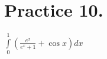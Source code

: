 \documentclass[a4paper,12pt]{article}
\begin{document}
%
%
%
\section*{Practice 10.}
$\int\limits_0^1(\frac{e^x}{e^x+1}+\cos x)dx$


%
%
%
%
%
%
%
\end{document}
